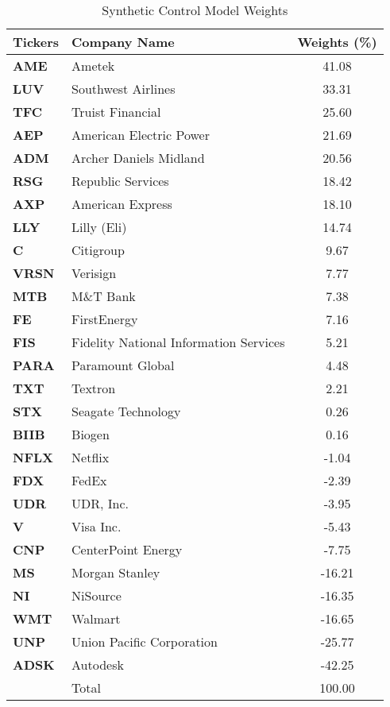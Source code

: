 \begin{table}[H] 
\centering
\caption{Synthetic Control Model Weights}
\label{tab:scm_weights}
\begin{tabular}{llc}
\toprule
 Tickers & Company Name & Weights (\%) \\
\midrule
\textbf{AME} & Ametek & 41.08 \\
\textbf{LUV} & Southwest Airlines & 33.31 \\
\textbf{TFC} & Truist Financial & 25.60 \\
\textbf{AEP} & American Electric Power & 21.69 \\
\textbf{ADM} & Archer Daniels Midland & 20.56 \\
\textbf{RSG} & Republic Services & 18.42 \\
\textbf{AXP} & American Express & 18.10 \\
\textbf{LLY} & Lilly (Eli) & 14.74 \\
\textbf{C} & Citigroup & 9.67 \\
\textbf{VRSN} & Verisign & 7.77 \\
\textbf{MTB} & M\&T Bank & 7.38 \\
\textbf{FE} & FirstEnergy & 7.16 \\
\textbf{FIS} & Fidelity National Information Services & 5.21 \\
\textbf{PARA} & Paramount Global & 4.48 \\
\textbf{TXT} & Textron & 2.21 \\
\textbf{STX} & Seagate Technology & 0.26 \\
\textbf{BIIB} & Biogen & 0.16 \\
\textbf{NFLX} & Netflix & -1.04 \\
\textbf{FDX} & FedEx & -2.39 \\
\textbf{UDR} & UDR, Inc. & -3.95 \\
\textbf{V} & Visa Inc. & -5.43 \\
\textbf{CNP} & CenterPoint Energy & -7.75 \\
\textbf{MS} & Morgan Stanley & -16.21 \\
\textbf{NI} & NiSource & -16.35 \\
\textbf{WMT} & Walmart & -16.65 \\
\textbf{UNP} & Union Pacific Corporation & -25.77 \\
\textbf{ADSK} & Autodesk & -42.25 \\
\bottomrule
 & Total& 100.00 \\
\bottomrule
\end{tabular}


\end{table}
